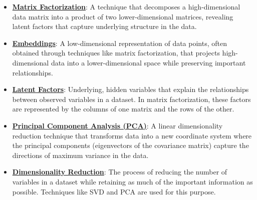 \documentclass{article}%
\begin{document}
\begin{itemize}[leftmargin=*]%
\item \href{https://purdue.brightspace.com/d2l/common/assets/pdfjs-d2l-dist/1.0.14-legacy/web/viewer.html?file=\%2Fcontent\%2Fenforced\%2F1095467-wl.202510.CS.24300.001\%2F11L2-svd-pca-recommender.pdf\%3Fou\%3D1095467\&lang=en-us\&container=d2l-fileviewer-rendered-pdf\&fullscreen=d2l-fileviewer-rendered-pdf-dialog\&height=667#page=2}{\textbf{Matrix Factorization}}: A technique that decomposes a high-dimensional data matrix into a product of two lower-dimensional matrices, revealing latent factors that capture underlying structure in the data.%
\item \href{https://purdue.brightspace.com/d2l/common/assets/pdfjs-d2l-dist/1.0.14-legacy/web/viewer.html?file=\%2Fcontent\%2Fenforced\%2F1095467-wl.202510.CS.24300.001\%2F11L2-svd-pca-recommender.pdf\%3Fou\%3D1095467\&lang=en-us\&container=d2l-fileviewer-rendered-pdf\&fullscreen=d2l-fileviewer-rendered-pdf-dialog\&height=667#page=5}{\textbf{Embeddings}}: A low-dimensional representation of data points, often obtained through techniques like matrix factorization, that projects high-dimensional data into a lower-dimensional space while preserving important relationships.%
\item \href{https://purdue.brightspace.com/d2l/common/assets/pdfjs-d2l-dist/1.0.14-legacy/web/viewer.html?file=\%2Fcontent\%2Fenforced\%2F1095467-wl.202510.CS.24300.001\%2F11L2-svd-pca-recommender.pdf\%3Fou\%3D1095467\&lang=en-us\&container=d2l-fileviewer-rendered-pdf\&fullscreen=d2l-fileviewer-rendered-pdf-dialog\&height=667#page=5}{\textbf{Latent Factors}}: Underlying, hidden variables that explain the relationships between observed variables in a dataset. In matrix factorization, these factors are represented by the columns of one matrix and the rows of the other.%
\item \href{https://purdue.brightspace.com/d2l/common/assets/pdfjs-d2l-dist/1.0.14-legacy/web/viewer.html?file=\%2Fcontent\%2Fenforced\%2F1095467-wl.202510.CS.24300.001\%2F11L2-svd-pca-recommender.pdf\%3Fou\%3D1095467\&lang=en-us\&container=d2l-fileviewer-rendered-pdf\&fullscreen=d2l-fileviewer-rendered-pdf-dialog\&height=667#page=15}{\textbf{Principal Component Analysis (PCA)}}: A linear dimensionality reduction technique that transforms data into a new coordinate system where the principal components (eigenvectors of the covariance matrix) capture the directions of maximum variance in the data.%
\item \href{https://purdue.brightspace.com/d2l/common/assets/pdfjs-d2l-dist/1.0.14-legacy/web/viewer.html?file=\%2Fcontent\%2Fenforced\%2F1095467-wl.202510.CS.24300.001\%2F11L2-svd-pca-recommender.pdf\%3Fou\%3D1095467\&lang=en-us\&container=d2l-fileviewer-rendered-pdf\&fullscreen=d2l-fileviewer-rendered-pdf-dialog\&height=667#page=8}{\textbf{Dimensionality Reduction}}: The process of reducing the number of variables in a dataset while retaining as much of the important information as possible. Techniques like SVD and PCA are used for this purpose.%

\end{itemize}
\end{document}
